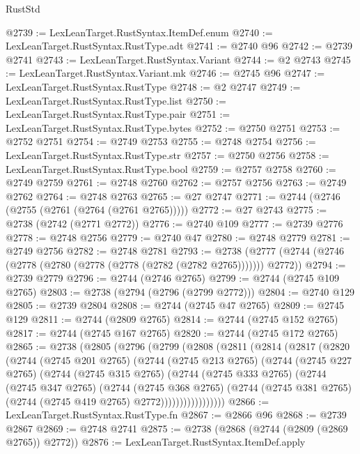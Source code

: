 \begin{lexlean}{RustStd}
\begin{coremodule}
@2739 := LexLeanTarget.RustSyntax.ItemDef.enum
@2740 := LexLeanTarget.RustSyntax.RustType.adt
@2741 := @2740 @96
@2742 := @2739 @2741
@2743 := LexLeanTarget.RustSyntax.Variant
@2744 := @2 @2743
@2745 := LexLeanTarget.RustSyntax.Variant.mk
@2746 := @2745 @96
@2747 := LexLeanTarget.RustSyntax.RustType
@2748 := @2 @2747
@2749 := LexLeanTarget.RustSyntax.RustType.list
@2750 := LexLeanTarget.RustSyntax.RustType.pair
@2751 := LexLeanTarget.RustSyntax.RustType.bytes
@2752 := @2750 @2751
@2753 := @2752 @2751
@2754 := @2749 @2753
@2755 := @2748 @2754
@2756 := LexLeanTarget.RustSyntax.RustType.str
@2757 := @2750 @2756
@2758 := LexLeanTarget.RustSyntax.RustType.bool
@2759 := @2757 @2758
@2760 := @2749 @2759
@2761 := @2748 @2760
@2762 := @2757 @2756
@2763 := @2749 @2762
@2764 := @2748 @2763
@2765 := @27 @2747
@2771 := @2744 (@2746 (@2755 (@2761 (@2764 (@2761 @2765)))))
@2772 := @27 @2743
@2775 := @2738 (@2742 (@2771 @2772))
@2776 := @2740 @109
@2777 := @2739 @2776
@2778 := @2748 @2756
@2779 := @2740 @47
@2780 := @2748 @2779
@2781 := @2749 @2756
@2782 := @2748 @2781
@2793 := @2738 (@2777 (@2744 (@2746 (@2778 (@2780 (@2778 (@2778 (@2782 (@2782 @2765))))))) @2772))
@2794 := @2739 @2779
@2796 := @2744 (@2746 @2765)
@2799 := @2744 (@2745 @109 @2765)
@2803 := @2738 (@2794 (@2796 (@2799 @2772)))
@2804 := @2740 @129
@2805 := @2739 @2804
@2808 := @2744 (@2745 @47 @2765)
@2809 := @2745 @129
@2811 := @2744 (@2809 @2765)
@2814 := @2744 (@2745 @152 @2765)
@2817 := @2744 (@2745 @167 @2765)
@2820 := @2744 (@2745 @172 @2765)
@2865 := @2738
    (@2805
      (@2796
        (@2799
          (@2808
            (@2811
              (@2814
                (@2817
                  (@2820
                    (@2744
                      (@2745 @201 @2765)
                      (@2744
                        (@2745 @213 @2765)
                        (@2744
                          (@2745 @227 @2765)
                          (@2744
                            (@2745 @315 @2765)
                            (@2744
                              (@2745 @333 @2765)
                              (@2744
                                (@2745 @347 @2765)
                                (@2744
                                  (@2745 @368 @2765)
                                  (@2744
                                    (@2745 @381 @2765)
                                    (@2744 (@2745 @419 @2765) @2772)))))))))))))))))
@2866 := LexLeanTarget.RustSyntax.RustType.fn
@2867 := @2866 @96
@2868 := @2739 @2867
@2869 := @2748 @2741
@2875 := @2738 (@2868 (@2744 (@2809 (@2869 @2765)) @2772))
@2876 := LexLeanTarget.RustSyntax.ItemDef.apply

\end{coremodule}
\end{lexlean}
